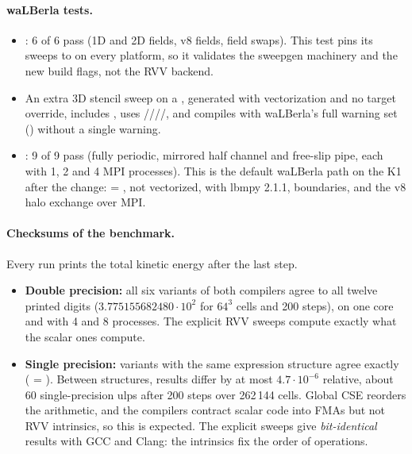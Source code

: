 \paragraph{waLBerla tests.}
\begin{itemize}
  \item {}: 6 of 6 pass (1D and 2D fields, v8 fields, field
        swaps). This test pins its sweeps to  on every platform, so it
        validates the sweepgen machinery and the new build flags, not the RVV backend.
  \item An extra 3D stencil sweep on a , generated with
        vectorization and no target override, includes , uses
        ////, and compiles
        with waLBerla's full warning set ()
        without a single warning.
  \item {}: 9 of 9 pass (fully periodic, mirrored half channel
        and free-slip pipe, each with 1, 2 and 4 MPI processes). This is the default
        waLBerla path on the K1 after the change:  = ,
        not vectorized, with lbmpy 2.1.1, boundaries, and the v8 halo exchange over MPI.
\end{itemize}

\paragraph{Checksums of the benchmark.}
Every run prints the total kinetic energy after the last step.
\begin{itemize}
  \item \textbf{Double precision:} all six variants of both compilers agree to all
        twelve printed digits ($3.775155682480\cdot10^{2}$ for $64^3$ cells and 200
        steps), on one core and with 4 and 8 processes. The explicit RVV sweeps compute
        exactly what the scalar ones compute.
  \item \textbf{Single precision:} variants with the same expression structure agree
        exactly ( = ). Between structures, results differ by
        at most $4.7\cdot10^{-6}$ relative, about 60 single-precision ulps after
        200 steps over 262\,144 cells. Global CSE reorders the arithmetic, and the
        compilers contract scalar code into FMAs but not RVV intrinsics, so this is
        expected. The explicit sweeps give \emph{bit-identical} results with GCC and
        Clang: the intrinsics fix the order of operations.
\end{itemize}

